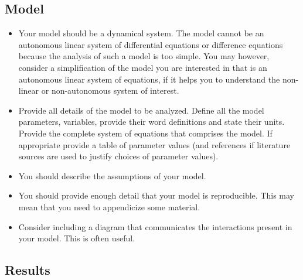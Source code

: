 \documentclass[]{book}
\providecommand{\tightlist}{%
  \setlength{\itemsep}{0pt}\setlength{\parskip}{0pt}}
\begin{document}
\subsection{Model}\label{model}

\begin{itemize}
\tightlist
\item
  Your model should be a dynamical system. The model cannot be an
  autonomous linear system of differential equations or difference
  equations because the analysis of such a model is too simple. You may
  however, consider a simplification of the model you are interested in
  that is an autonomous linear system of equations, if it helps you to
  understand the non-linear or non-autonomous system of interest.
\item
  Provide all details of the model to be analyzed. Define all the model
  parameters, variables, provide their word definitions and state their
  units. Provide the complete system of equations that comprises the
  model. If appropriate provide a table of parameter values (and
  references if literature sources are used to justify choices of
  parameter values).
\item
  You should describe the assumptions of your model.
\item
  You should provide enough detail that your model is reproducible. This
  may mean that you need to appendicize some material.
\item
  Consider including a diagram that communicates the interactions
  present in your model. This is often useful.
\end{itemize}

\subsection{Results}\label{results}
\end{document}
